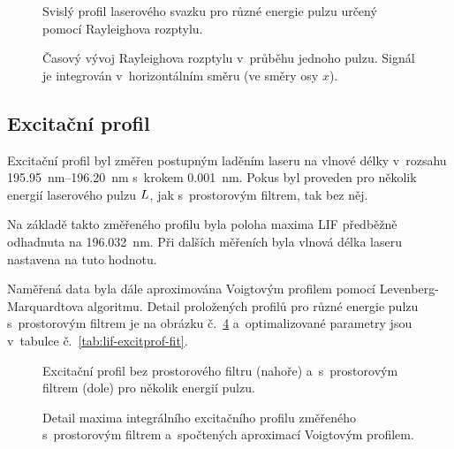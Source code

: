 \begin{figure}
	
	\caption{Svislý profil laserového svazku pro různé energie pulzu
		určený pomocí Rayleighova rozptylu.}
	\label{fig:lif-rayleigh-profile}
\end{figure}

\begin{figure}
	\centerline{}
	\caption{Časový vývoj Rayleighova rozptylu v~průběhu jednoho pulzu.
		Signál je integrován v~horizontálním směru (ve směry osy $x$).}
	\label{fig:lif-rayleigh-time}
\end{figure}

\subsection{Excitační profil}
\label{sec:lif-excitprof}
Excitační profil byl změřen postupným laděním laseru na vlnové délky
v~rozsahu \SIrange{195.95}{196.20}{\nano\metre}
s~krokem \SI{0.001}{\nano\metre}.
Pokus byl proveden pro několik energií laserového pulzu $L$,
jak s~prostorovým filtrem, tak bez něj.

Na základě takto změřeného profilu byla poloha maxima LIF předběžně
odhadnuta na \SI{196.032}{\nano\metre}.
Při dalších měřeních byla vlnová délka laseru na\-stavena na tuto hodnotu.

Naměřená data byla dále aproximována Voigtovým profilem pomocí
Le\-ven\-berg-Marquardtova algoritmu.
Detail proložených profilů pro různé energie pulzu s~prostorovým filtrem
je na obrázku č.~\ref{fig:lif-excitprof-fit}
a~optimalizované parametry jsou v~tabulce č.~\ref{tab:lif-excitprof-fit}.

\begin{figure}
	
	\bigskip\par
	
	\caption{Excitační profil bez prostorového filtru (nahoře)
		a~s~prostorovým filtrem (dole) pro několik energií pulzu.}
	\label{fig:lif-excitprof-filter}
\end{figure}

\begin{figure}
	
	\caption{Detail maxima integrálního excitačního profilu
		změřeného s~prostorovým filtrem
		a~spočtených aproximací Voigtovým profilem.}
	\label{fig:lif-excitprof-fit}
\end{figure}

